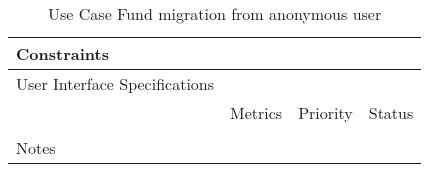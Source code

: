 \begin{table}[H]
\begin{tabularx}{\linewidth}{|l|X|X|X|}
    \hline Constraints                   & \multicolumn{3}{l|}{}                                                                                 \\

    \hline User Interface Specifications & \multicolumn{3}{l|}{}                                                                                 \\

    \hline \multirow{2}{*}{}             & Metrics                                                                           & Priority & Status \\
    \cline{2-4}                          &                                                                                   &          &        \\
    \hline Notes                         & \multicolumn{3}{l|}{}                                                                                 \\
    \hline
  \end{tabularx}
  \caption{Use Case Fund migration from anonymous user}
  \label{tab:use_case_fund_migration_from_anonymous_user}
\end{table}

